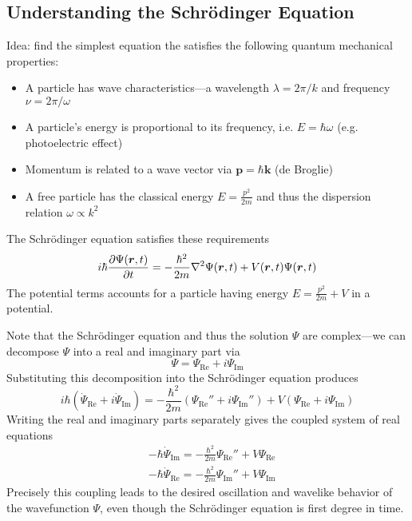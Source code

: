 \documentclass[11pt, a4paper]{article}
\newcommand{\Schro}{Schr\"{o}dinger\xspace}
\renewcommand{\vec}[1]{\bm{#1}} %
\renewcommand{\r}{\vec{r}}  %
\renewcommand{\P}{\Psi}  %
\begin{document}
\subsection{Understanding the \Schro Equation} 
Idea: find the simplest equation the satisfies the following quantum mechanical properties:
\begin{itemize}
	\item A particle has wave characteristics---a wavelength $ \lambda = 2\pi/k $ and frequency $ \nu = 2\pi/\omega $
	
	\item A particle's energy is proportional to its frequency, i.e. $ E = \hbar \omega $ (e.g. photoelectric effect)
	
	\item Momentum is related to a wave vector via $ \vec{p} = \hbar \vec{k} $ (de Broglie)
	
	\item A free particle has the classical energy $ E = \frac{p^{2}}{2m} $ and thus the dispersion relation $ \omega \propto k^{2} $
\end{itemize}
The \Schro equation satisfies these requirements
\begin{equation*}
	i \hbar \pdv{\Psi(\r, t)}{t} = - \frac{\hbar^{2}}{2m}\laplacian \P(\r, t) + V(\r, t)\Psi(\r, t)
\end{equation*}
The potential terms accounts for a particle having energy $ E = \frac{p^{2}}{2m} + V $ in a potential. 

Note that the \Schro equation and thus the solution $ \P $ are complex---we can decompose $ \P $ into a real and imaginary part via
\begin{equation*}
	\P = \P_{\text{Re}} + i \P_{\text{Im}}
\end{equation*}
Substituting this decomposition into the \Schro equation produces
\begin{equation*}
	i \hbar (\dot{\P}_{\text{Re}} + i \dot{\P}_{\text{Im}})  = - \frac{\hbar^{2}}{2m} (\P_{\text{Re}}'' + i \P_{\text{Im}}'') + V(\P_{\text{Re}} + i \P_{\text{Im}})
\end{equation*}
Writing the real and imaginary parts separately gives the coupled system of real equations
\begin{align*}
	&- \hbar \dot{\P}_{\text{Im}} = - \frac{\hbar^{2}}{2m}\Psi_{\text{Re}}'' + V \P_{\text{Re}}\\
	& - \hbar \dot{\P}_{\text{Re}} = - \frac{\hbar^{2}}{2m}\Psi_{\text{Im}}'' + V \P_{\text{Im}}
\end{align*}
Precisely this coupling leads to the desired oscillation and wavelike behavior of the wavefunction $ \P $, even though the \Schro equation is first degree in time.
\end{document}
